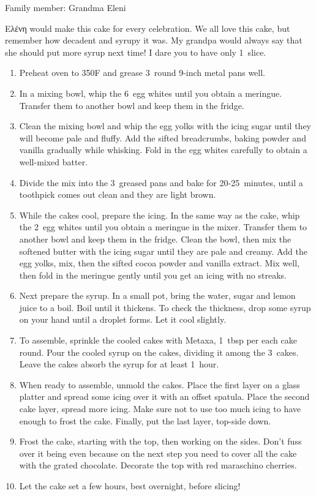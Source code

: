 Family member: Grandma Eleni


 \textgreek{Ελένη} would make this cake for every celebration. We all love this cake, but remember how decadent and syrupy it was. My grandpa would always say that she should put more syrup next time! I dare you to have only 1~slice.

\begin{enumerate}
    \item Preheat oven to 350\degree F and grease 3~round 9-inch metal pans well.
    \item In a mixing bowl, whip the 6~egg whites until you obtain a meringue. Transfer them to another bowl and keep them in the fridge.
    \item Clean the mixing bowl and whip the egg yolks with the icing sugar until they will become pale and fluffy. Add the sifted breadcrumbs, baking powder and vanilla gradually while whisking. Fold in the egg whites carefully to obtain a well-mixed batter.
    \item Divide the mix into the 3~greased pans and bake for 20-25~minutes, until a toothpick comes out clean and they are light brown.
    \item While the cakes cool, prepare the icing. In the same way as the cake, whip the 2~egg whites until you obtain a meringue in the mixer. Transfer them to another bowl and keep them in the fridge. Clean the bowl, then mix the softened butter with the icing sugar until they are pale and creamy. Add the egg yolks, mix, then the sifted cocoa powder and vanilla extract. Mix well, then fold in the meringue gently until you get an icing with no streaks.
    \item Next prepare the syrup. In a small pot, bring the water, sugar and lemon juice to a boil. Boil until it thickens. To check the thickness, drop some syrup on your hand until a droplet forms. Let it cool slightly.
    \item To assemble, sprinkle the cooled cakes with Metaxa, 1~tbsp per each cake round. Pour the cooled syrup on the cakes, dividing it among the 3~cakes. Leave the cakes absorb the syrup for at least 1~hour.
    \item When ready to assemble, unmold the cakes. Place the first layer on a glass platter and spread some icing over it with an offset spatula. Place the second cake layer, spread more icing. Make sure not to use too much icing to have enough to frost the cake. Finally, put the last layer, top-side down.
    \item Frost the cake, starting with the top, then working on the sides. Don't fuss over it being even because on the next step you need to cover all the cake with the grated chocolate. Decorate the top with red maraschino cherries.
    \item Let the cake set a few hours, best overnight, before slicing!
\end{enumerate}
